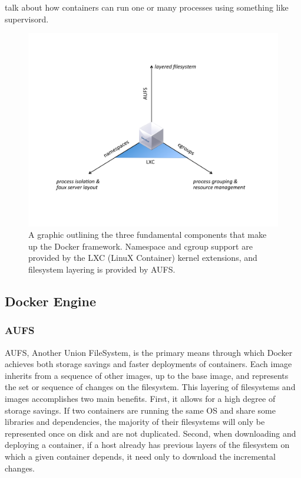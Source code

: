 \documentclass[\myfontsize, letterpaper]{article}
\begin{document}
talk about how containers can run one or many processes using something like supervisord.

\begin{figure}[h]
\centering
    \includegraphics[width=1.0\textwidth]{docker.pdf}
    \caption{A graphic outlining the three fundamental components that make up the Docker framework. Namespace and cgroup support are provided by the LXC (LinuX Container) kernel extensions, and filesystem layering is provided by AUFS.}
\end{figure}

\subsection{Docker Engine}

\subsubsection{AUFS}
AUFS, Another Union FileSystem, is the primary means through which Docker achieves both storage savings and faster deployments of containers. Each image inherits from a sequence of other images, up to the base image, and represents the set or sequence of changes on the filesystem. This layering of filesystems and images accomplishes two main benefits. First, it allows for a high degree of storage savings. If two containers are running the same OS and share some libraries and dependencies, the majority of their filesystems will only be represented once on disk and are not duplicated. Second, when downloading and deploying a container, if a host already has previous layers of the filesystem on which a given container depends, it need only to download the incremental changes.
\end{document}
